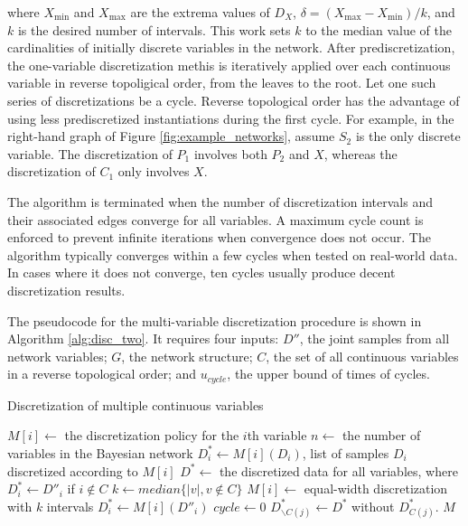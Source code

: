 \noindent
where $X_\text{min}$ and $X_\text{max}$ are the extrema values of $D_X$, $\delta = (X_\text{max} - X_\text{min})/k$, and $k$ is the desired number of intervals.
This work sets $k$ to the median value of the cardinalities of initially discrete variables in the network.
After prediscretization, the one-variable discretization methis is iteratively applied over each continuous variable in reverse topoligical order, from the leaves to the root.
Let one such series of discretizations be a cycle.
Reverse topological order has the advantage of using less prediscretized instantiations during the first cycle.
For example, in the right-hand graph of Figure \ref{fig:example_networks}, assume $S_2$ is the only discrete variable.
The discretization of $P_1$ involves both $P_2$ and $X$, whereas the discretization of $C_1$ only involves $X$.

The algorithm is terminated when the number of discretization intervals and their associated edges converge for all variables.
A maximum cycle count is enforced to prevent infinite iterations when convergence does not occur.
The algorithm typically converges within a few cycles when tested on real-world data.
In cases where it does not converge, ten cycles usually produce decent discretization results.

The pseudocode for the multi-variable discretization procedure is shown in Algorithm \ref{alg:disc_two}.
It requires four inputs: $D''$, the joint samples from all network variables; $G$, the network structure; $C$, the set of all continuous variables in a reverse topological order; and $u_{cycle}$, the upper bound of times of cycles.

\begin{algorithm}
  \label{alg:disc_two}
  \caption{Discretization of multiple continuous variables }
  \begin{algorithmic}[5]
    \State
    \State $M[i] \leftarrow$ the discretization policy for the $i$th variable
    \State $n \leftarrow$ the number of variables in the Bayesian network
    \State $D^*_i \leftarrow M[i] (D_i)$, list of samples $D_i$ discretized according to $M[i]$
    \State $D^* \leftarrow $ the discretized data for all variables, where $D^*_i \leftarrow D''_i$ if $i \notin C$
    \State $k \leftarrow median\{ |v|, v\notin C\}$
    \State
        \State $M[i] \leftarrow$  equal-width discretization with $k$ intervals
        \State $D^*_i \leftarrow  M[i] (D''_i)$
      \EndIf
    \EndFor
    \State
    \State $cycle \leftarrow 0$
        \State $D^*_{\backslash C(j)} \leftarrow D^*$ without $D^*_{C(j)}$.
      \EndFor
    \EndWhile
    \State \Return $M$
  \EndFunction
  \end{algorithmic}
\end{algorithm}


